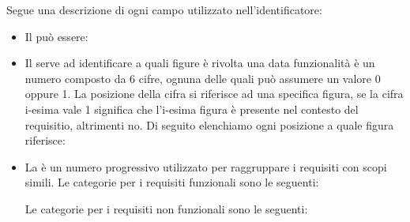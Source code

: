 \noindent
Segue una descrizione di ogni campo utilizzato nell'identificatore:
\begin{itemize}
	\item Il  può essere:

	\item Il  serve ad identificare a quali figure è rivolta una data funzionalità è un numero composto da 6 cifre, ognuna delle quali può assumere un valore 0 oppure 1. La posizione della cifra si riferisce ad una specifica figura, se la cifra i-esima vale 1 significa che l'i-esima figura è presente nel contesto del requisitio, altrimenti no.
	Di seguito elenchiamo ogni posizione a quale figura riferisce: 

	\item La  è un numero progressivo utilizzato per raggruppare i requisiti con scopi simili.
	Le categorie per i requisiti funzionali sono le seguenti:
	Le categorie per i requisiti non funzionali sono le seguenti:


\end{itemize}
